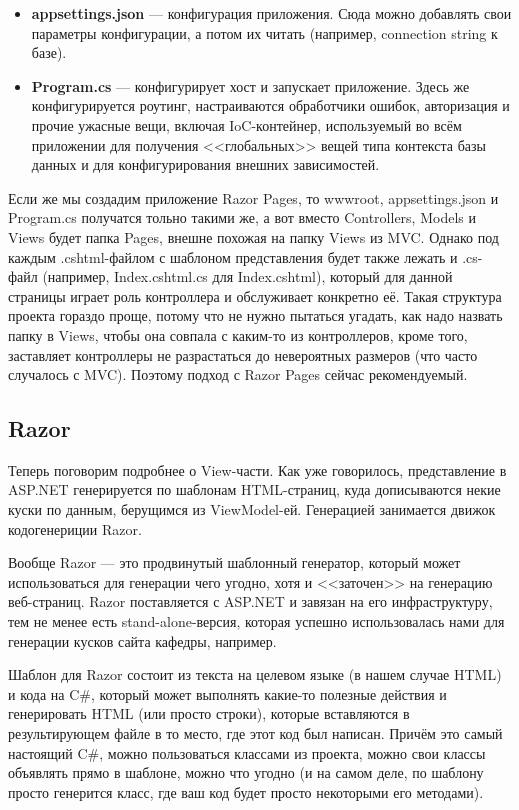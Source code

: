 \documentclass{../../text-style}
\begin{document}
\begin{itemize}
    \item \textbf{appsettings.json} --- конфигурация приложения. Сюда можно добавлять свои параметры конфигурации, а потом их читать (например, connection string к базе).
    \item \textbf{Program.cs} --- конфигурирует хост и запускает приложение. Здесь же конфигурируется роутинг, настраиваются обработчики ошибок, авторизация и прочие ужасные вещи, включая IoC-контейнер, используемый во всём приложении для получения <<глобальных>> вещей типа контекста базы данных и для конфигурирования внешних зависимостей.
\end{itemize}

Если же мы создадим приложение Razor Pages, то wwwroot, appsettings.json и Program.cs получатся тольно такими же, а вот вместо Controllers, Models и Views будет папка Pages, внешне похожая на папку Views из MVC. Однако под каждым .cshtml-файлом с шаблоном представления будет также лежать и .cs-файл (например, Index.cshtml.cs для Index.cshtml), который для данной страницы играет роль контроллера и обслуживает конкретно её. Такая структура проекта гораздо проще, потому что не нужно пытаться угадать, как надо назвать папку в Views, чтобы она совпала с каким-то из контроллеров, кроме того, заставляет контроллеры не разрастаться до невероятных размеров (что часто случалось с MVC). Поэтому подход с Razor Pages сейчас рекомендуемый.

\subsection{Razor}

Теперь поговорим подробнее о View-части. Как уже говорилось, представление в ASP.NET генерируется по шаблонам HTML-страниц, куда дописываются некие куски по данным, берущимся из ViewModel-ей. Генерацией занимается движок кодогенериции Razor.

Вообще Razor --- это продвинутый шаблонный генератор, который может использоваться для генерации чего угодно, хотя и <<заточен>> на генерацию веб-страниц. Razor поставляется с ASP.NET и завязан на его инфраструктуру, тем не менее есть stand-alone-версия, которая успешно использовалась нами для генерации кусков сайта кафедры, например.

Шаблон для Razor состоит из текста на целевом языке (в нашем случае HTML) и кода на C\#, который может выполнять какие-то полезные действия и генерировать HTML (или просто строки), которые вставляются в результирующем файле в то место, где этот код был написан. Причём это самый настоящий C\#, можно пользоваться классами из проекта, можно свои классы объявлять прямо в шаблоне, можно что угодно (и на самом деле, по шаблону просто генерится класс, где ваш код будет просто некоторыми его методами).
\end{document}
